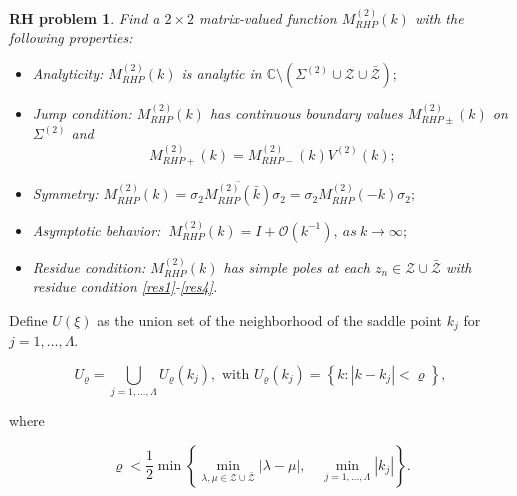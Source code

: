 \documentclass[11pt]{article}
\numberwithin{equation}{section}
\newtheorem{RHP}{RH problem}
\begin{document}
\begin{RHP}\label{rhp5}
    Find a $2\times 2$ matrix-valued function $M^{(2)}_{RHP}(k)$ with the following properties:
\begin{itemize}
  \item Analyticity: $M^{(2)}_{RHP}(k)$ is analytic in $\mathbb{C}\setminus(\Sigma^{(2)}\cup\mathcal{Z}\cup\bar{\mathcal{Z}});$
  \item Jump condition: $M^{(2)}_{RHP}(k)$ has continuous boundary values $M^{(2)}_{RHP\pm}(k)$ on $\Sigma^{(2)}$ and
 \begin{equation*}
M^{(2)}_{RHP+}(k)=M^{(2)}_{RHP-}(k)V^{(2)}(k);
\end{equation*}
\item Symmetry:
$M^{(2)}_{RHP}(k)=\sigma_2 \overline{ M^{(2)}_{RHP}(\bar{k})}\sigma_2=\sigma_2 M^{(2)}_{RHP}(-k)\sigma_2;$

  \item Asymptotic behavior:
  $\ M^{(2)}_{RHP}(k)=I+\mathcal{O}(k^{-1}),\ as \ k\to \infty;$

\item Residue condition: $M^{(2)}_{RHP}(k)$ has simple poles at each $z_n\in\mathcal{Z}\cup\bar{\mathcal{Z}}$ with residue condition \eqref{res1}-\eqref{res4}.
\end{itemize}
\end{RHP}

Define $U(\xi)$ as the union set of the neighborhood of the saddle point $k_j$ for $j=1,\dots,\Lambda$.

$$
U_{\varrho}=\bigcup_{j=1,\dots,\Lambda} U_{\varrho}\left(k_j\right), \text { with } U_{\varrho}\left(k_j\right)=\left\{k:\left|k-k_j\right|<\varrho\right\},
$$

where

$$
\varrho<\frac{1}{2} \min \left\{\min _{\lambda,\mu\in\mathcal{Z}\cup\bar{\mathcal{Z}}}\left|\lambda-\mu\right|, \quad \min _{j=1,\dots,\Lambda}\left|k_j\right|\right\}.
$$
\end{document}
